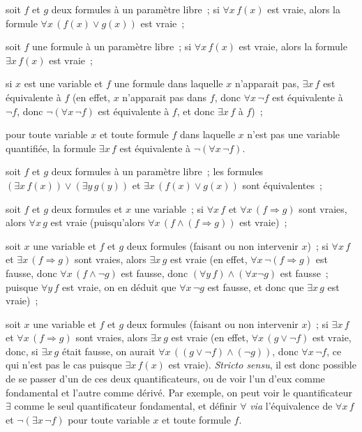   \item soit $f$ et $g$ deux formules à un paramètre libre ; si $\forall x \, f(x)$ est vraie, alors la formule $\forall x \, (f(x) \vee g(x))$ est vraie ; 
  \item soit $f$ une formule à un paramètre libre ; si $\forall x \, f(x)$ est vraie, alors la formule $\exists x \, f(x)$ est vraie ; 
  \item si $x$ est une variable et $f$ une formule dans laquelle $x$ n'apparait pas, $\exists x \, f$ est équivalente à $f$ (en effet, $x$ n'apparait pas dans $f$, donc $\forall x \, \lnot f$ est équivalente à $\lnot f$, donc $\lnot (\forall x \, \lnot f)$ est équivalente à $f$, et donc $\exists x \, f$ à $f$) ; 
  \item pour toute variable $x$ et toute formule $f$ dans laquelle $x$ n'est pas une variable quantifiée, la formule $\exists x \, f$ est équivalente à $\lnot (\forall x \, \lnot f)$.
  \item soit $f$ et $g$ deux formules à un paramètre libre ; les formules $(\exists x \, f(x)) \vee (\exists y \, g(y))$ et $\exists x \, (f(x) \vee g(x))$ sont équivalentes ;
  \item soit $f$ et $g$ deux formules et $x$ une variable ; si $\forall x \, f$ et $\forall x \, (f \Rightarrow g)$ sont vraies, alors $\forall x \, g$ est vraie (puisqu'alors $\forall x \, (f \wedge (f \Rightarrow g))$ est vraie) ; 
  \item soit $x$ une variable et $f$ et $g$ deux formules (faisant ou non intervenir $x$) ; si $\forall x \, f$ et $\exists x \, (f \Rightarrow g)$ sont vraies, alors $\exists x \, g$ est vraie (en effet, $\forall x \, \lnot (f \Rightarrow g)$ est fausse, donc $\forall x \, (f \wedge \lnot g)$ est fausse, donc $(\forall y \, f) \wedge (\forall x \lnot g)$ est fausse ; puisque $\forall y \, f$ est vraie, on en déduit que $\forall x \, \lnot g$ est fausse, et donc que $\exists x \, g$ est vraie) ; 
  \item soit $x$ une variable et $f$ et $g$ deux formules (faisant ou non intervenir $x$) ; si $\exists x \, f$ et $\forall x \, (f \Rightarrow g)$ sont vraies, alors $\exists x \, g$ est vraie (en effet, $\forall x \, (g \vee \lnot f)$ est vraie, donc, si $\exists x \, g$ était fausse, on aurait $\forall x \, ((g \vee \lnot f) \wedge (\lnot g))$, donc $\forall x \, \lnot f$, ce qui n'est pas le cas puisque $\exists x \, f(x)$ est vraie). 
\stopitemize
\emph{Stricto sensu}, il est donc possible de se passer d'un de ces deux quantificateurs, ou de voir l'un d'eux comme fondamental et l'autre comme dérivé. 
Par exemple, on peut voir le quantificateur $\exists$ comme le seul quantificateur fondamental, et définir $\forall$ \emph{via} l'équivalence de $\forall x \, f$ et $\lnot \left( \exists x \, \lnot f \right)$ pour toute variable $x$ et toute formule $f$. 

